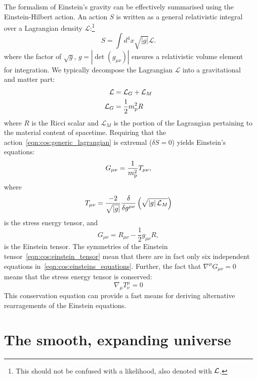 The formalism of Einstein's gravity can be effectively summarised using the Einstein-Hilbert action. An action $S$ is written as a general relativistic integral over a Lagrangian density $\mathcal{L}$:\footnote{This should not be confused with a likelihood, also denoted with $\mathcal{L}$.}
\begin{equation}
  S = \int d^4 x \sqrt{|g|} \mathcal{L}.
  \label{eqn:cos:generic_lagrangian}
\end{equation}
where the factor of $\sqrt{g}$, $g=\left|\det\left( g_{\mu\nu} \right)\right|$ ensures a relativistic volume element for integration.
We typically decompose the Lagrangian $\mathcal{L}$ into a gravitational and matter part:
\begin{align}
  \mathcal{L} &= \mathcal{L}_G + \mathcal{L}_M
  \label{eqn:cos:decomp}\\
  \mathcal{L}_G &= \frac{1}{2} m_{\mathrm{p}}^2 R
  \label{eqn:cos:L_grav}
\end{align}
where $R$ is the Ricci scalar and $\mathcal{L}_M$ is the portion of the Lagrangian pertaining to the material content of spacetime. Requiring that the action~\eqref{eqn:cos:generic_lagrangian} is extremal ($\delta S = 0$) yields Einstein's equations:
\begin{equation}
  G_{\mu\nu} = \frac{1}{m_{\mathrm{p}}^2}T_{\mu\nu},
  \label{eqn:cos:einsteins_equations}
\end{equation}
where
\begin{equation}
  T_{\mu\nu} = \frac{-2}{\sqrt{\left|g\right|}}\frac{\delta}{\delta g^{\mu\nu}}\left( \sqrt{\left|g\right| \mathcal{L}_M} \right)
  \label{eqn:cos:SET_fundamantal}
\end{equation}
is the stress energy tensor, and
\begin{equation}
  G_{\mu\nu} = R_{\mu\nu} - \frac{1}{2}g_{\mu\nu} R,
  \label{eqn:cos:einstein_tensor}
\end{equation}
is the Einstein tensor. The symmetries of the Einstein tensor~\eqref{eqn:cos:einstein_tensor} mean that there are in fact only six independent equations in~\eqref{eqn:cos:einsteins_equations}. Further, the fact that $\nabla^\mu G_{\mu\nu}=0$ means that the stress energy tensor is conserved:
\begin{equation}
  \nabla_\mu T^{\mu}_{\nu} = 0
  \label{eqn:cos:SET_conservation}
\end{equation}
This conservation equation can provide a fast means for deriving alternative rearragements of the Einstein equations.

\section{The smooth, expanding universe}
